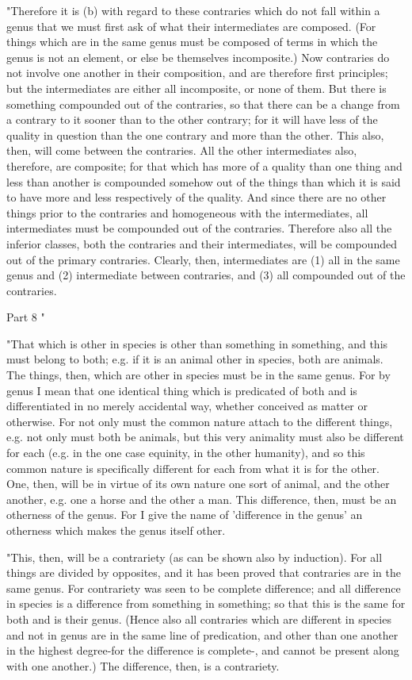 "Therefore it is (b) with regard to these contraries which do not
fall within a genus that we must first ask of what their intermediates
are composed. (For things which are in the same genus must be composed
of terms in which the genus is not an element, or else be themselves
incomposite.) Now contraries do not involve one another in their composition,
and are therefore first principles; but the intermediates are either
all incomposite, or none of them. But there is something compounded
out of the contraries, so that there can be a change from a contrary
to it sooner than to the other contrary; for it will have less of
the quality in question than the one contrary and more than the other.
This also, then, will come between the contraries. All the other intermediates
also, therefore, are composite; for that which has more of a quality
than one thing and less than another is compounded somehow out of
the things than which it is said to have more and less respectively
of the quality. And since there are no other things prior to the contraries
and homogeneous with the intermediates, all intermediates must be
compounded out of the contraries. Therefore also all the inferior
classes, both the contraries and their intermediates, will be compounded
out of the primary contraries. Clearly, then, intermediates are (1)
all in the same genus and (2) intermediate between contraries, and
(3) all compounded out of the contraries. 

Part 8 "

"That which is other in species is other than something in something,
and this must belong to both; e.g. if it is an animal other in species,
both are animals. The things, then, which are other in species must
be in the same genus. For by genus I mean that one identical thing
which is predicated of both and is differentiated in no merely accidental
way, whether conceived as matter or otherwise. For not only must the
common nature attach to the different things, e.g. not only must both
be animals, but this very animality must also be different for each
(e.g. in the one case equinity, in the other humanity), and so this
common nature is specifically different for each from what it is for
the other. One, then, will be in virtue of its own nature one sort
of animal, and the other another, e.g. one a horse and the other a
man. This difference, then, must be an otherness of the genus. For
I give the name of 'difference in the genus' an otherness which makes
the genus itself other. 

"This, then, will be a contrariety (as can be shown also by induction).
For all things are divided by opposites, and it has been proved that
contraries are in the same genus. For contrariety was seen to be complete
difference; and all difference in species is a difference from something
in something; so that this is the same for both and is their genus.
(Hence also all contraries which are different in species and not
in genus are in the same line of predication, and other than one another
in the highest degree-for the difference is complete-, and cannot
be present along with one another.) The difference, then, is a contrariety.

